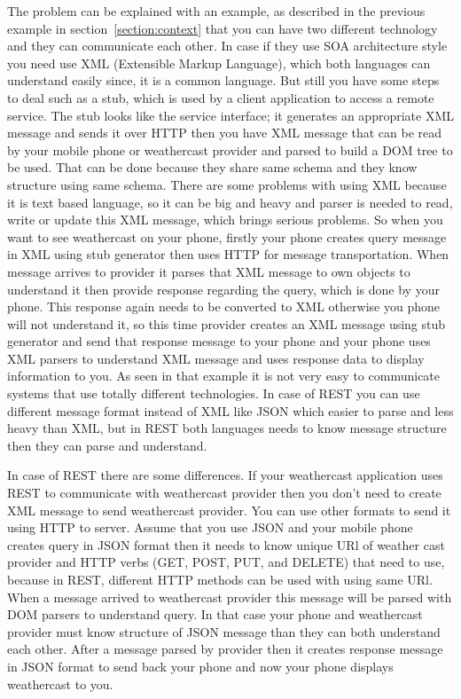 The problem can be explained with an example, as described in the previous example in section \ref{section:context} that you can have two different technology and they can communicate each other. In case if they use SOA architecture style you need use XML (Extensible Markup Language), which both languages can understand easily since, it is a common language. But still you have some steps to deal such as a stub, which is used by a client application to access a remote service. The stub looks like the service interface\citep{thesis:introduction3}; it generates an appropriate XML message and sends it over HTTP then you have XML message that can be read by your mobile phone or weathercast provider and parsed to build a DOM tree to be used. That can be done because they share same schema and they know structure using same schema. There are some problems with using XML because it is text based language, so it can be big and heavy and parser is needed to read, write or update this XML message, which brings serious problems. So when you want to see weathercast on your phone, firstly your phone creates query message in XML using stub generator then uses HTTP for message transportation. When message arrives to provider it parses that XML message to own objects to understand it then provide response regarding the query, which is done by your phone. This response again needs to be converted to XML otherwise you phone will not understand it, so this time provider creates an XML message using stub generator and send that response message to your phone and your phone uses XML parsers to understand XML message and uses response data to display information to you. As seen in that example it is not very easy to communicate systems that use totally different technologies. In case of REST you can use different message format instead of XML like JSON which easier to parse and less heavy than XML, but in REST both languages needs to know message structure then they can parse and understand.

In case of REST there are some differences. If your weathercast application uses REST to communicate with weathercast provider then you don’t need to create XML message to send weathercast provider. You can use other formats to send it using HTTP to server. Assume that you use JSON and your mobile phone creates query in JSON format then it needs to know unique URl of weather cast provider and HTTP verbs (GET, POST, PUT, and DELETE) that need to use, because in REST, different HTTP methods can be used with using same URl.  When a message arrived to weathercast provider this message will be parsed with DOM parsers to understand query. In that case your phone and weathercast provider must know structure of JSON message than they can both understand each other. After a message parsed by provider then it creates response message in JSON format to send back your phone and now your phone displays weathercast to you.

